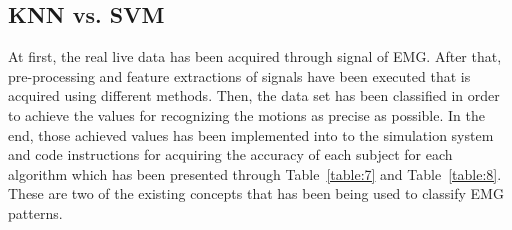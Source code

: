 \documentclass[conference]{IEEEtran}
\begin{document}
\subsection{KNN vs. SVM}
At first, the real live data has been acquired through signal of EMG. After that, pre-processing and feature extractions of signals have been executed that is acquired using different methods. Then, the data set has been classified in order to achieve the values for recognizing the motions as precise as possible. In the end, those achieved values has been implemented into to the simulation system and code instructions for acquiring the accuracy of each subject for each algorithm which has been presented through Table~\ref{table:7} and Table~\ref{table:8}. These are two of the existing concepts that has been being used to classify EMG patterns.
\begin{table}


\end{table}
\end{document}
